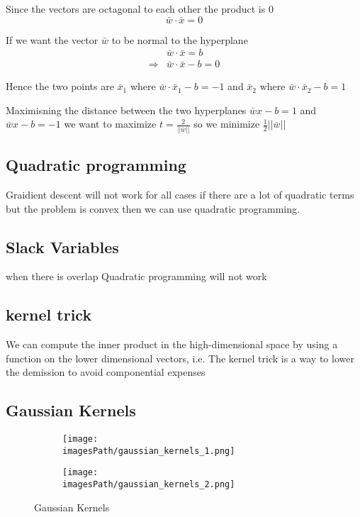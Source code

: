 Since the vectors are octagonal to each other the product is 0
\begin{equation*}
    \bar{w}\cdot\bar{x} = 0
\end{equation*}

If we want the vector $\bar{w}$ to be normal to the hyperplane
\begin{align*}
    &\bar{w}\cdot\bar{x} = b \\
    \Rightarrow &\bar{w}\cdot\bar{x} - b = 0
\end{align*}

Hence the two points are $\bar{x}_1$ where $\bar{w}\cdot\bar{x}_1 -b = -1$ and 
$\bar{x}_2$ where $\bar{w}\cdot\bar{x}_2 -b = 1$

Maximisning the distance between the two hyperplanes $\bar{w}x-b=1$ and $\bar{w}x-b=-1$
we want to maximize $t=\frac{2}{||\bar{w}||}$ so we minimize $\frac{1}{2}||\bar{w}||$

\newpage
\subsection{Quadratic programming}
Graidient descent will not work for all cases if there are a lot of quadratic terms but 
the problem is convex then we can use quadratic programming.

\subsection{Slack Variables}
when there is overlap Quadratic programming will not work

\subsection{kernel trick}
We can compute the inner product in the high-dimensional space by
using a function on the lower dimensional vectors,
i.e. The kernel trick is a way to lower the demission to avoid componential expenses

\subsection{Gaussian Kernels}
\begin{figure}
     \centering
     \begin{subfigure}[b]{0.4\textwidth}
         \centering
         \texttt{[image: \\imagesPath/gaussian\_kernels\_1.png]}
     \end{subfigure}
     \hfill
     \begin{subfigure}[b]{0.4\textwidth}
         \centering
         \texttt{[image: \\imagesPath/gaussian\_kernels\_2.png]}
     \end{subfigure}
        \caption{Gaussian Kernels}
\end{figure}


